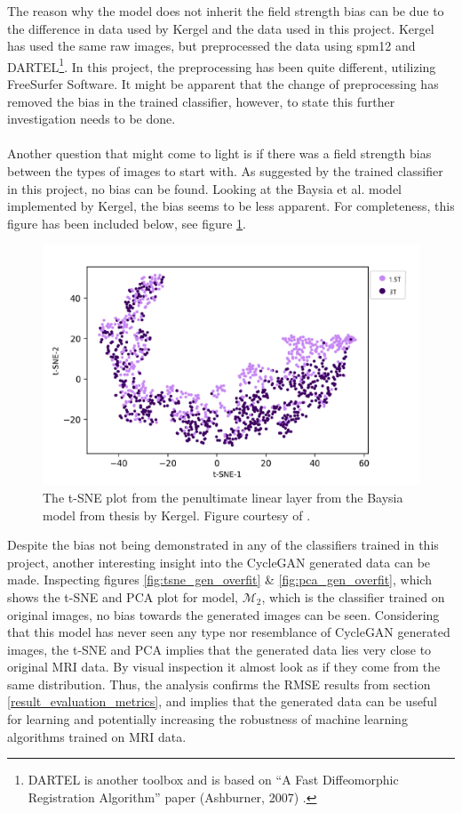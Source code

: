\documentclass[11pt, fleqn, titlepage]{article}
\newcommand{\1}[1]{\mathds{1}\left[#1\right]}
\begin{document}
The reason why the model does not inherit the field strength bias can be due to the difference in data used by Kergel and the data used in this project. Kergel has used the same raw images, but preprocessed the data using spm12 and DARTEL\footnote{DARTEL is another toolbox and is based on “A Fast Diffeomorphic Registration Algorithm” paper
	(Ashburner, 2007) \cite{dartel}. }. In this project, the preprocessing has been quite different, utilizing FreeSurfer Software. It might be apparent that the change of preprocessing has removed the bias in the trained classifier, however, to state this further investigation needs to be done. 
\\\\
Another question that might come to light is if there was a field strength bias between the types of images to start with. As suggested by the trained classifier in this project, no bias can be found. Looking at the Baysia et al. model implemented by Kergel, the bias seems to be less apparent. For completeness, this figure has been included below, see figure \ref{fig:kergelbay}.

\begin{figure}[H]
	\centering
	\includegraphics[width=0.7\linewidth]{imgs/kergel_bay}
	\caption{The t-SNE plot from the penultimate linear layer from the Baysia model from thesis by Kergel. Figure courtesy of \cite{CamillaKandidat}.}
	\label{fig:kergelbay}
\end{figure}
\noindent Despite the bias not being demonstrated in any of the classifiers trained in this project, another interesting insight into the CycleGAN generated data can be made. Inspecting figures \ref{fig:tsne_gen_overfit} \& \ref{fig:pca_gen_overfit}, which shows the t-SNE and PCA plot for model, $ \mathcal M_2 $, which is the classifier trained on original images, no bias towards the generated images can be seen. Considering that this model has never seen any type nor resemblance of CycleGAN generated images, the t-SNE and PCA implies that the generated data lies very close to original MRI data. By visual inspection it almost look as if they come from the same distribution. Thus, the analysis confirms the RMSE results from section \ref{result_evaluation_metrics}, and implies that the generated data can be useful for learning and potentially increasing the robustness of machine learning algorithms trained on MRI data.
\end{document}
